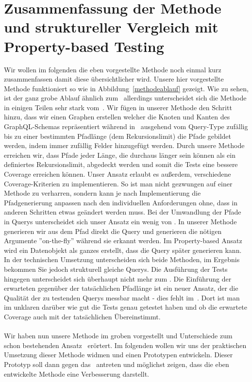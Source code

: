 \section{Zusammenfassung der Methode und struktureller Vergleich mit Property-based Testing}

Wir wollen im folgenden die eben vorgestellte Methode noch einmal kurz zusammenfassen damit diese übersichtlicher wird.
Unsere hier vorgestellte Methode funktioniert so wie in Abbildung~\ref{methodeablauf} gezeigt.
Wie zu sehen, ist der ganz grobe Ablauf ähnlich zum~\cite[Property-based Testing]{property-based-testing} allerdings unterscheidet sich die
Methode in einigen Teilen sehr stark vom~\cite[Property-based Testing]{property-based-testing}.
Wir fügen in unserer Methode den Schritt hinzu, dass wir einen Graphen erstellen welcher die Knoten und Kanten des GraphQL-Schemas repräsentiert
während in~\cite[Property-based Testing]{property-based-testing} ausgehend vom Query-Type zufällig bis zu einer bestimmten Pfadlänge (dem Rekursionslimit)
die Pfade gebildet werden, indem immer zufällig Felder hinzugefügt werden.
Durch unsere Methode erreichen wir, dass Pfade jeder Länge, die durchaus länger sein können als ein definiertes Rekursionslimit, abgedeckt werden und
somit die Tests eine bessere Coverage erreichen können.
Unser Ansatz erlaubt es außerdem, verschiedene Coverage-Kriterien zu implementieren.
So ist man nicht gezwungen auf einer Methode zu verharren, sondern kann je nach Implementierung die Pfadgenerierung anpassen nach den individuellen
Anforderungen ohne, dass in anderen Schritten etwas geändert werden muss.
Bei der Umwandlung der Pfade in Querys unterscheidet sich unser Ansatz ein wenig von \cite[Property-based Testing]{property-based-testing}.
In unserer Methode generieren wir aus dem Pfad direkt die Query und generieren die nötigen Argumente ''on-the-fly'' während sie erkannt werden.
Im Property-based Ansatz wird ein Datenobjekt als ganzes erstellt, dass die Query später generieren kann.
In der technischen Umsetzung unterscheiden sich beide Methoden, im Ergebnis bekommen Sie jedoch strukturell gleiche Querys.
Die Ausführung der Tests hingegen unterscheidet sich überhaupt nicht mehr zum \cite[Property-based Testing]{property-based-testing}.
Die Einführung der erwarteten gegenüber der tatsächlichen Pfadlänge ist ein neuer Ansatz, der die Qualität der zu testenden Querys
messbar macht - dies fehlt im~\cite[Property-based Testing]{property-based-testing}.
Dort ist man im unklaren darüber wie gut die Tests genau getestet haben und ob die erwartete Coverage auch mit der tatsächlichen Übereinstimmt.
\\
\\
Wir haben nun unsere Methode im groben vorgestellt und Unterschiede zum schon bestehenden Ansatz~\cite[Property-based Testing]{property-based-testing} erörtert.
Im folgenden wollen wir uns der praktischen Umsetzung dieser Methode widmen und einen Prototypen entwickeln.
Dieser Prototyp soll dann gegen das~\cite[Property-based Testing Tool]{property-based-testing} antreten und möglichst zeigen, dass die eben entwickelte Methode
eine Verbesserung darstellt.






